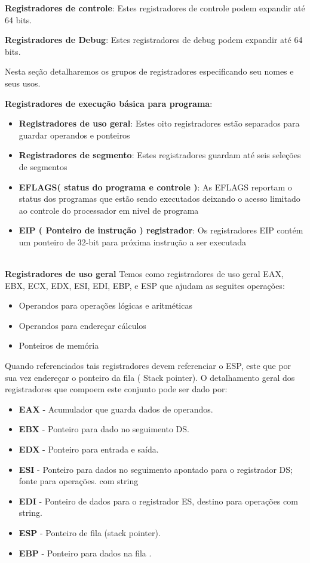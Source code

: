 \documentclass[12pt,a4paper,brazilian,utf8]{ppgsi}
\begin{document}
    \textbf{Registradores de controle}: Estes registradores de controle podem expandir até 64 bits.
    
    \textbf{Registradores de Debug}: Estes registradores de debug podem expandir até 64 bits.
    
    Nesta seção detalharemos os grupos de registradores especificando seu nomes e seus usos.
    
    \textbf{Registradores de execução básica para programa}:
    \begin{itemize}
        \item \textbf{Registradores de uso geral}: Estes oito registradores estão separados para guardar operandos e ponteiros 
        
        \item \textbf{Registradores de segmento}: Estes registradores guardam até seis seleções de segmentos
        
        \item \textbf{EFLAGS( status do programa e controle )}: As EFLAGS reportam o status dos programas que estão
        sendo executados deixando o acesso limitado ao controle do processador em nivel de programa 
        
        \item \textbf{EIP ( Ponteiro de instrução ) registrador}: Os registradores EIP contém um ponteiro de 32-bit para próxima instrução a ser executada
        
    \end{itemize}
    \\ \textbf{Registradores de uso geral}
    Temos como registradores de uso geral  EAX, EBX, ECX, EDX, ESI, EDI, EBP, e ESP que ajudam as seguites operações:
    \begin{itemize}
        \item Operandos para operações lógicas e aritméticas
        \item Operandos para endereçar cálculos
        \item Ponteiros de memória
    \end{itemize}
	Quando referenciados tais registradores devem referenciar o ESP, este que por sua vez endereçar o ponteiro da fila ( Stack pointer).
	O detalhamento geral dos registradores que compoem este conjunto pode ser dado por:
    \begin{itemize}
    	\item \textbf{EAX} - Acumulador que guarda dados de operandos. 
    	\item \textbf{EBX} - Ponteiro para dado no seguimento DS.
    	\item \textbf{EDX} - Ponteiro para entrada e saída.
    	\item \textbf{ESI} - Ponteiro para dados no seguimento apontado para o registrador DS; fonte para operações. com string
    	\item \textbf{EDI} - Ponteiro de dados para o registrador ES, destino para operações com string.
    	\item \textbf{ESP} - Ponteiro de fila (stack pointer).
    	\item \textbf{EBP} - Ponteiro para dados na fila .
    \end{itemize}
    
\end{document}
